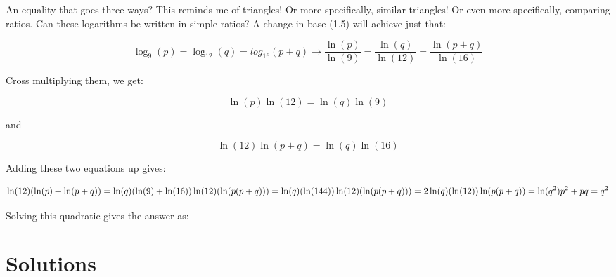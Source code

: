 \begin{solution}

An equality that goes three ways? This reminds me of triangles! Or more specifically, similar triangles! Or even more specifically, comparing ratios. Can these logarithms be written in simple ratios? A change in base (1.5) will achieve just that:

$$
   \log_9(p) = \log_{12}(q) = log_{16}(p+q) \rightarrow
   \frac{\ln(p)}{\ln(9)} = \frac{\ln(q)}{\ln(12)} = \frac{\ln(p+q)}{\ln(16)}
$$

\newpage

Cross multiplying them, we get:

$$
  \ln(p)\ln(12) = \ln(q)\ln(9)
$$

and

$$
  \ln(12)\ln(p+q) = \ln(q)\ln(16)
$$

Adding these two equations up gives:

$$
  \ln(12)(\ln(p)+\ln(p+q)) = \ln(q)(\ln(9)+\ln(16)) \\
  \ln(12)(\ln(p(p+q))) = \ln(q)(\ln(144)) \\
  \ln(12)(\ln(p(p+q))) = 2\ln(q)(\ln(12)) \\
  \ln(p(p+q)) = \ln(q^2) \\
  p^2 + pq = q^2
$$

Solving this quadratic gives the answer as: 

\end{solution}



\newpage
\section{Solutions}


\printsolutions